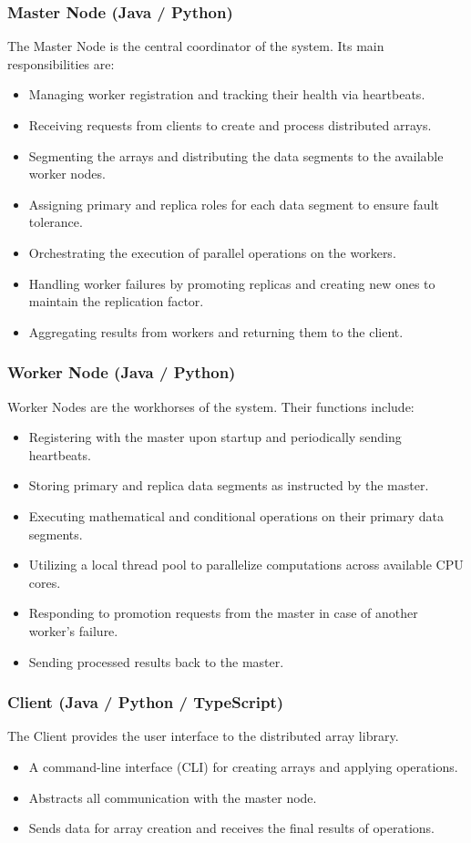 \documentclass[10pt,a4paper]{article}
\theoremstyle{definition}
\theoremstyle{remark}
\begin{document}
\subsubsection{Master Node (Java / Python)}
The Master Node is the central coordinator of the system. Its main responsibilities are:
\begin{itemize}
    \item Managing worker registration and tracking their health via heartbeats.
    \item Receiving requests from clients to create and process distributed arrays.
    \item Segmenting the arrays and distributing the data segments to the available worker nodes.
    \item Assigning primary and replica roles for each data segment to ensure fault tolerance.
    \item Orchestrating the execution of parallel operations on the workers.
    \item Handling worker failures by promoting replicas and creating new ones to maintain the replication factor.
    \item Aggregating results from workers and returning them to the client.
\end{itemize}

\subsubsection{Worker Node (Java / Python)}
Worker Nodes are the workhorses of the system. Their functions include:
\begin{itemize}
    \item Registering with the master upon startup and periodically sending heartbeats.
    \item Storing primary and replica data segments as instructed by the master.
    \item Executing mathematical and conditional operations on their primary data segments.
    \item Utilizing a local thread pool to parallelize computations across available CPU cores.
    \item Responding to promotion requests from the master in case of another worker's failure.
    \item Sending processed results back to the master.
\end{itemize}

\subsubsection{Client (Java / Python / TypeScript)}
The Client provides the user interface to the distributed array library.
\begin{itemize}
    \item A command-line interface (CLI) for creating arrays and applying operations.
    \item Abstracts all communication with the master node.
    \item Sends data for array creation and receives the final results of operations.
\end{itemize}
\end{document}
